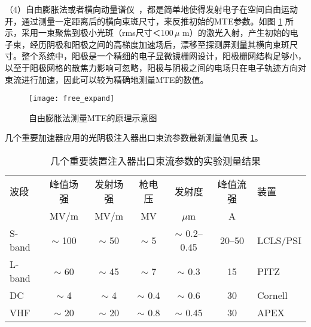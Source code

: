 （4）自由膨胀法或者横向动量谱仪~\cite{feng2015novel,jones2013commissioning}，都是简单地使得发射电子在空间自由运动开，通过测量一定距离后的横向束斑尺寸，来反推初始的MTE参数。如图 \ref{fig:free_expand} 所示，采用一束聚焦到极小光斑（rms尺寸＜100\,$\mu$ m）的激光入射，产生初始的电子束，经历阴极和阳极之间的高梯度加速场后，漂移至探测屏测量其横向束斑尺寸。整个系统中，阳极是一个精细的电子显微镜栅网设计，阳极栅网结构足够小，以至于阳极网格的散焦力影响可忽略，阳极与阴极之间的电场只在电子轨迹方向对束流进行加速，因此可以较为精确地测量MTE的数值\cite{jones2013commissioning}。
\begin{figure}[htbp]
\centering
\texttt{[image: free\_expand]}
\caption{\label{fig:free_expand} 自由膨胀法测量MTE的原理示意图}
\end{figure}

几个重要加速器应用的光阴极注入器出口束流参数最新测量值见表 \ref{tab:record-emit}。
\begin{table}[htbp]
\caption{几个重要装置注入器出口束流参数的实验测量结果}
\label{tab:record-emit}
\centering
\begin{tabular}{lcccccl}
\toprule
波段 & 峰值场强 & 发射场强 & 枪电压 & 发射度 & 峰值流强 & 装置 \\
 & MV/m & MV/m & MV & $\mu$m & A & \\
\midrule
S-band & $\sim$ 100 & $\sim$ 50 & $\sim$ 5 & $\sim$ 0.2--0.45 & 20--50 & LCLS/PSI \\
L-band & $\sim$ 60 & $\sim$ 45 & $\sim$ 7 & $\sim$ 0.3 & 15 & PITZ \\
DC & $\sim$ 4 & $\sim$ 4 & $\sim$ 0.4 & $\sim$ 0.6 & 30 & Cornell \\
VHF & $\sim$ 20 & $\sim$ 20 & $\sim$ 0.8 & $\sim$ 0.45 & 30 & APEX \\
\bottomrule
\end{tabular}
\end{table}


